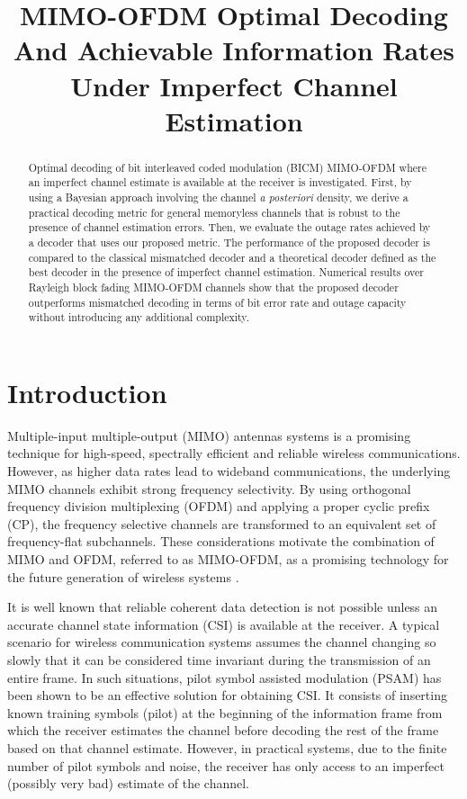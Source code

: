 \documentclass{article}
\title{MIMO-OFDM Optimal Decoding And Achievable Information Rates \\Under Imperfect Channel Estimation}
\begin{document}
\ninept
\maketitle
\vspace{-3mm}
\begin{abstract}

Optimal decoding of bit interleaved coded modulation (BICM) MIMO-OFDM where an imperfect channel estimate is available at the receiver is investigated. First, by using a Bayesian approach involving the channel {\it a posteriori} density, we derive a practical decoding metric for general memoryless channels that is robust to the presence of channel estimation errors. Then, we evaluate the outage rates achieved by a decoder that uses our proposed metric.
The performance of the proposed decoder is compared to the classical mismatched decoder and a theoretical decoder defined as the best decoder in the presence of imperfect channel estimation.
Numerical results over Rayleigh block fading MIMO-OFDM channels show that the proposed decoder outperforms mismatched decoding in terms of bit error rate and outage capacity without introducing any additional complexity.
\end{abstract}
\vspace{-5mm}
\section{Introduction}


Multiple-input multiple-output (MIMO) antennas systems is a promising technique for high-speed, spectrally efficient and reliable wireless communications. However, as higher data rates lead to wideband communications, the underlying MIMO channels exhibit strong frequency selectivity. By using orthogonal frequency division multiplexing (OFDM) and applying a proper cyclic prefix (CP), the frequency selective channels are transformed to an equivalent set of frequency-flat subchannels. These considerations motivate the combination of MIMO and OFDM, referred to as MIMO-OFDM, as a promising technology for the future generation of wireless systems \cite{bolskei02}.

It is well known that reliable coherent data detection is not possible unless an accurate channel state information (CSI) is available at the receiver. A typical scenario for wireless communication systems assumes the channel changing so slowly that it can be considered time invariant during the transmission of an entire frame. In such situations, pilot symbol assisted modulation (PSAM) has been shown to be an effective solution for obtaining CSI. It consists of inserting known training symbols (pilot) at the beginning of the information frame from which the receiver estimates the channel before decoding the rest of the frame based on that channel estimate. However, in practical systems, due to the finite number of pilot symbols and noise, the receiver has only access to an imperfect (possibly very bad) estimate of the channel.
\end{document}
